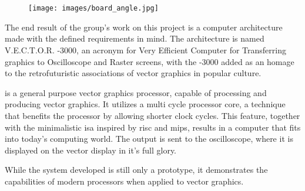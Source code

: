 \chapter{\vthreek}

\begin{figure}[H]
    \centering \texttt{[image: images/board\_angle.jpg]}
    \caption{\vthreek}
    \label{fig:board-angle}
\end{figure}

The end result of the group's work on this project is a computer architecture made with the defined requirements in mind.
The architecture is named V.E.C.T.O.R. -3000, an acronym for Very Efficient Computer for Transferring graphics to Oscilloscope and Raster screens, with the -3000 added as an homage to the retrofuturistic associations of vector graphics in popular culture.

\vthreek is a general purpose vector graphics processor, capable of processing and producing vector graphics. 
It utilizes a multi cycle processor core, a technique that benefits the processor by allowing shorter clock cycles.
This feature, together with the minimalistic \gls{isa} inspired by \gls{risc}\cite{risc} and \gls{mips}\cite{mips}, results in a computer that fits into today's computing world.
The output is sent to the oscilloscope, where it is displayed on the vector display in it's full glory.

While the system developed is still only a prototype, it demonstrates the capabilities of modern processors when applied to vector graphics. 




